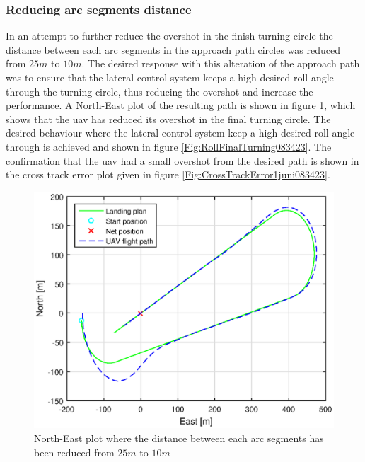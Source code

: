 \subsubsection{Reducing arc segments distance}
In an attempt to further reduce the overshot in the finish turning circle the distance between each arc segments in the approach path circles was reduced from $25 m$ to $10 m$. The desired response with this alteration of the approach path was to ensure that the lateral control system keeps a high desired roll angle through the turning circle, thus reducing the overshot and increase the performance. A North-East plot of the resulting path is shown in figure \ref{Fig:NorthEast1juni083423}, which shows that the \gls{uav} has reduced its overshot in the final turning circle. The desired behaviour where the lateral control system keep a high desired roll angle through is achieved and shown in figure \ref{Fig:RollFinalTurning083423}. The confirmation that the \gls{uav} had a small overshot from the desired path is shown in the cross track error plot given in figure \ref{Fig:CrossTrackError1juni083423}.
\begin{figure}[H]
\centering
\includegraphics[scale=0.7]{figs/Experiment/NorthEast1juni083423.eps}
\caption{North-East plot where the distance between each arc segments has been reduced from $25 m$ to $10 m$}
\label{Fig:NorthEast1juni083423}
\end{figure}
